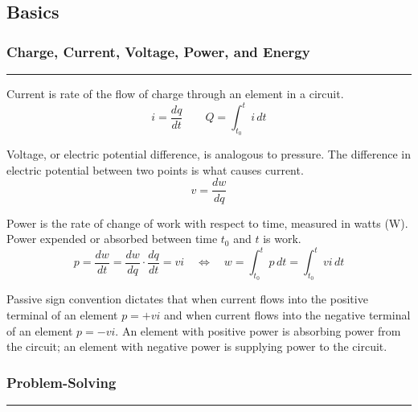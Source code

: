 \documentclass{article}
\begin{document}
    \tableofcontents
    \pagebreak


    \begin{center}
        \subsection*{Basics}
    \end{center}

    \medskip
    \subsubsection*{Charge, Current, Voltage, Power, and Energy}
    \vspace{-1em}
    \rule{\linewidth}{0.1mm}

    \vspace{0.2em}\noindent
    Current is rate of the flow of charge through an element in a circuit.
    \[
        i = \frac{dq}{dt} \qquad Q = \int_{t_0}^t i\,dt
    \]

    \vspace{.2em}\noindent
    Voltage, or electric potential difference, is analogous to pressure.
    The difference in electric potential between two points is what causes current.
    \[
        v = \frac{dw}{dq}
    \]

    \vspace{.2em}\noindent
    Power is the rate of change of work with respect to time, measured in watts (W). Power expended or absorbed between time $t_0$ and $t$ is work.
    \[
        p = \frac{dw}{dt} = \frac{dw}{dq} \cdot \frac{dq}{dt} = vi
        \quad \Longleftrightarrow \quad
        w=\int_{t_0}^t p\,dt = \int_{t_0}^t vi \,dt
    \]

    \vspace{.2em}\noindent
    Passive sign convention dictates that when current flows into the positive terminal of an element $p = +vi$ and when current flows into the negative terminal of an element $p = -vi$.
    An element with positive power is absorbing power from the circuit; an element with negative power is supplying power to the circuit.

    \smallskip
    \subsubsection*{Problem-Solving}
    \vspace{-1em}
    \rule{\linewidth}{0.1mm}
\end{document}
